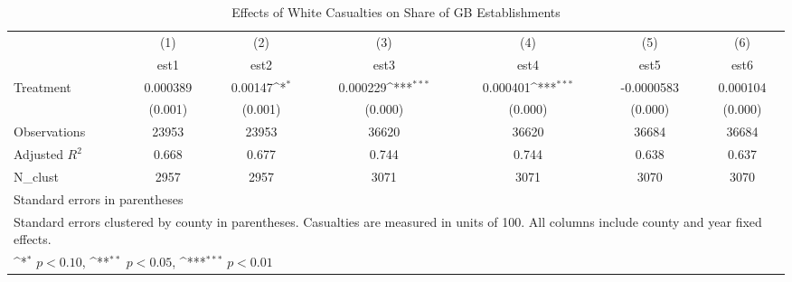 \begin{table}[htbp]\centering
\def\sym#1{\ifmmode^{#1}\else\(^{#1}\)\fi}
\caption{Effects of White Casualties on Share of GB Establishments}
\begin{tabular}{l*{6}{c}}
\hline\hline
                    &\multicolumn{1}{c}{(1)}&\multicolumn{1}{c}{(2)}&\multicolumn{1}{c}{(3)}&\multicolumn{1}{c}{(4)}&\multicolumn{1}{c}{(5)}&\multicolumn{1}{c}{(6)}\\
                    &\multicolumn{1}{c}{est1}&\multicolumn{1}{c}{est2}&\multicolumn{1}{c}{est3}&\multicolumn{1}{c}{est4}&\multicolumn{1}{c}{est5}&\multicolumn{1}{c}{est6}\\
\hline
Treatment           &    0.000389         &     0.00147\sym{*}  &    0.000229\sym{***}&    0.000401\sym{***}&  -0.0000583         &    0.000104         \\
                    &     (0.001)         &     (0.001)         &     (0.000)         &     (0.000)         &     (0.000)         &     (0.000)         \\
\hline
Observations        &       23953         &       23953         &       36620         &       36620         &       36684         &       36684         \\
Adjusted \(R^{2}\)  &       0.668         &       0.677         &       0.744         &       0.744         &       0.638         &       0.637         \\
N\_clust             &        2957         &        2957         &        3071         &        3071         &        3070         &        3070         \\
\hline\hline
\multicolumn{7}{l}{\footnotesize Standard errors in parentheses}\\
\multicolumn{7}{l}{\footnotesize Standard errors clustered by county in parentheses.         Casualties are measured in units of 100.          All columns include county and year fixed effects.}\\
\multicolumn{7}{l}{\footnotesize \sym{*} \(p<0.10\), \sym{**} \(p<0.05\), \sym{***} \(p<0.01\)}\\
\end{tabular}
\end{table}

